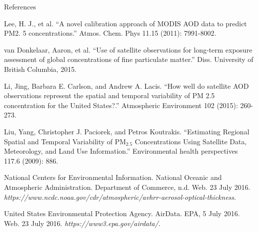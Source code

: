 \documentclass[notheorems,envcountsect,allowframebreaks,xcolor=svgnames,8pt]{beamer}
\newcommand{\rdd}{^{\mbox{\tiny{rd}}}}
\begin{document}
\begin{frame}{References}
	\begin{thebibliography}{99}
	\beamertemplatearticlebibitems
	
	
 Lee, H. J., et al. ``A novel calibration approach of MODIS AOD data to predict PM2. 5 concentrations.'' Atmos. Chem. Phys 11.15 (2011): 7991-8002.

 van Donkelaar, Aaron, et al. ``Use of satellite observations for long-term exposure assessment of global concentrations of fine particulate matter.'' Diss. University of British Columbia, 2015.

 Li, Jing, Barbara E. Carlson, and Andrew A. Lacis. ``How well do satellite AOD observations represent the spatial and temporal variability of PM 2.5 concentration for the United States?.'' Atmospheric Environment 102 (2015): 260-273.

 Liu, Yang, Christopher J. Paciorek, and Petros Koutrakis. ``Estimating Regional Spatial and Temporal Variability of PM$_{2.5}$ Concentrations Using Satellite Data, Meteorology, and Land Use Information.'' Environmental health perspectives 117.6 (2009): 886. 
	
	 National Centers for Environmental Information. National Oceanic and Atmospheric Administration. Department of Commerce, n.d. Web. 23 July 2016. \textit{https://www.ncdc.noaa.gov/cdr/atmospheric/avhrr-aerosol-optical-thickness}.
	
 United States Environmental Protection Agency. AirData. EPA, 5 July 2016. Web. 23 July 2016. \textit{https://www3.epa.gov/airdata/}.
	

	\end{thebibliography}
%	
%	
%	
%	
\end{frame}
\end{document}
